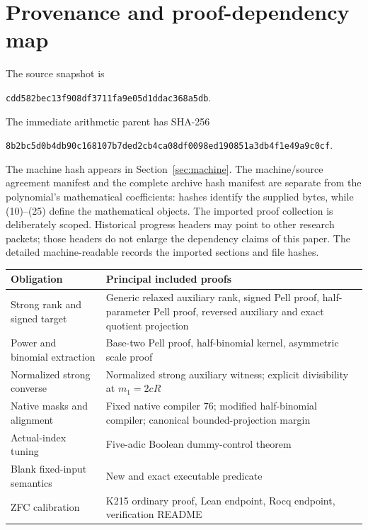 \documentclass[11pt,a4paper]{article}
\theoremstyle{definition}
\theoremstyle{remark}
\newcommand{\src}[1]{\texttt{\detokenize{#1}}}
\begin{document}
\section{Provenance and proof-dependency map}\label{app:provenance}
The source snapshot is
\begin{center}\small
\texttt{cdd582bec13f908df3711fa9e05d1ddac368a5db}.
\end{center}
The immediate arithmetic parent has SHA-256
\begin{center}\small
\texttt{8b2bc5d0b4db90c168107b7ded2cb4ca08df0098ed190851a3db4f1e49a9c0cf}.
\end{center}
The machine hash appears in Section~\ref{sec:machine}.
The machine/source agreement manifest and the complete
archive hash manifest are separate from the polynomial's
mathematical coefficients: hashes identify the supplied bytes,
while (10)--(25) define the mathematical objects.
The imported proof collection is deliberately scoped.
Historical progress headers may point to other research packets;
those headers do not enlarge the dependency claims of this paper.
The detailed machine-readable \src{data/proof_dependencies.json}
records the imported sections and file hashes.
\begin{center}
\begin{tabular}{p{}p{}}
\toprule
Obligation & Principal included proofs\\
\midrule
Strong rank and signed target &
Generic relaxed auxiliary rank, signed Pell proof, half-parameter
Pell proof, reversed auxiliary and exact quotient projection\\
Power and binomial extraction &
Base-two Pell proof, half-binomial kernel, asymmetric scale proof\\
Normalized strong converse &
Normalized strong auxiliary witness; explicit divisibility at \(m_1=2cR\)\\
Native masks and alignment &
Fixed native compiler 76; modified half-binomial compiler;
canonical bounded-projection margin\\
Actual-index tuning &
Five-adic Boolean dummy-control theorem\\
Blank fixed-input semantics &
New \src{blank_helical_proof.md} and exact executable predicate\\
ZFC calibration &
K215 ordinary proof, Lean endpoint, Rocq endpoint, verification README\\
\bottomrule
\end{tabular}
\end{center}
\end{document}

